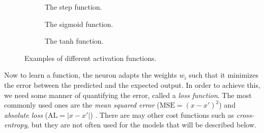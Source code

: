 \begin{figure}[ht]
  \begin{subfigure}[b]{0.32\textwidth}
    \centering
    \caption{The step function.}
  \end{subfigure}
  \begin{subfigure}[b]{0.32\textwidth}
    \centering
    \caption{The sigmoid function.}
  \end{subfigure}
  \begin{subfigure}[b]{0.32\textwidth}
    \centering
    \caption{The tanh function.}
  \end{subfigure}
  \caption{Examples of different activation functions.}

\label{fig:activation-functions}
\end{figure}

Now to learn a function, the neuron adapts the weights $w_i$ such that it minimizes the error between the predicted and the expected output.
In order to achieve this, we need some manner of quantifying the error, called a \textit{loss function}.
The most commonly used ones are the \textit{mean squared error} ($\text{MSE} = (x - x')^2$) and \textit{absolute loss} ($\text{AL} = | x - x' |$) \cite{nielsen_2017}.
There are may other cost functions such as \textit{cross-entropy}, but they are not often used for the models that will be described below.

